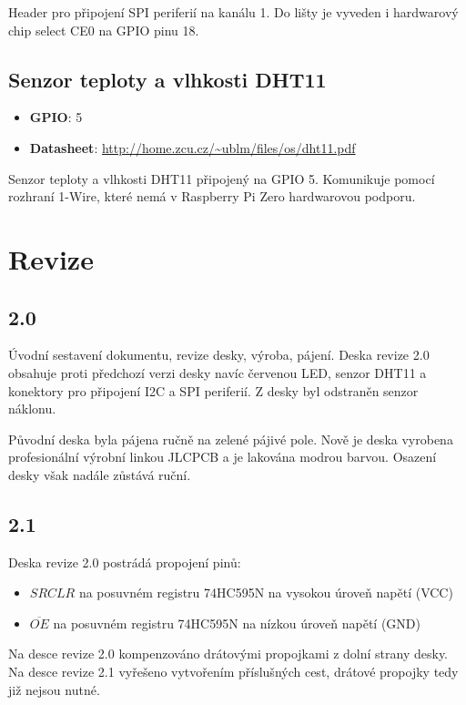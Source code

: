 \documentclass{article}
\newcommand\lang[2]{#1}
\begin{document}
\vspace{1em}

\noindent
\lang{Header pro připojení SPI periferií na kanálu 1. Do lišty je vyveden i hardwarový chip select CE0 na GPIO pinu 18.}
{Header for connecting SPI peripherals on channel 1. The header contains hardware chip select signal CE0 on GPIO 18.}

\subsection{\lang{Senzor teploty a vlhkosti DHT11}{Temperature and humidity sensor DHT11}}

\begin{itemize}[nosep]
	\item \textbf{GPIO}: 5
	\item \textbf{Datasheet}: \url{http://home.zcu.cz/~ublm/files/os/dht11.pdf}
\end{itemize}

\vspace{1em}

\noindent
\lang{Senzor teploty a vlhkosti DHT11 připojený na GPIO 5. Komunikuje pomocí rozhraní 1-Wire, které nemá v Raspberry Pi Zero hardwarovou podporu.}
{Temperature and humidity sensor DHT11 connected to GPIO 5. It communicates using the 1-Wire protocol, which does not have a built-in hardware support in Raspberry Pi Zero.}


\newpage

\section{Revize}

\subsection{2.0}

Úvodní sestavení dokumentu, revize desky, výroba, pájení. Deska revize 2.0 obsahuje proti předchozí verzi desky navíc červenou LED, senzor DHT11 a konektory pro připojení I2C a SPI periferií. Z desky byl odstraněn senzor náklonu.

\noindent Původní deska byla pájena ručně na zelené pájivé pole. Nově je deska vyrobena profesionální výrobní linkou JLCPCB a je lakována modrou barvou. Osazení desky však nadále zůstává ruční.

\subsection{2.1}

Deska revize 2.0 postrádá propojení pinů:

\begin{itemize}
    \item $SRCLR$ na posuvném registru 74HC595N na vysokou úroveň napětí (VCC)
    \item $\overline{OE}$ na posuvném registru 74HC595N na nízkou úroveň napětí (GND)
\end{itemize}

\noindent
Na desce revize 2.0 kompenzováno drátovými propojkami z dolní strany desky. Na desce revize 2.1 vyřešeno vytvořením příslušných cest, drátové propojky tedy již nejsou nutné.
\end{document}
